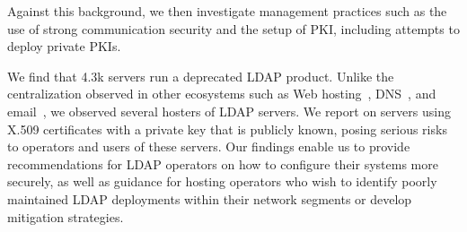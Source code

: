 Against this background, we then investigate management practices such as the use of strong communication security and the setup of \gls{PKI}, including attempts to deploy private \glspl{PKI}.

We find that 4.3k servers run a deprecated \gls{LDAP} product. Unlike the centralization observed in other ecosystems such as Web hosting~\cite{doan2022}, DNS~\cite{Moura2015}, and email~\cite{liuWhoGotYour2021}, we observed several hosters of \gls{LDAP} servers. We report on servers using X.509 certificates with a private key that is publicly known, posing serious risks to operators and users of these servers. Our findings enable us to provide recommendations for \gls{LDAP} operators on how to configure their systems more securely, as well as guidance for hosting operators who wish to identify poorly maintained \gls{LDAP} deployments within their network segments or develop mitigation strategies.
